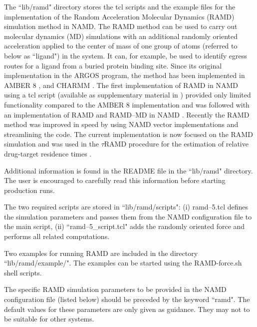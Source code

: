 The ``lib/ramd" directory stores the tcl scripts and the example files for the implementation of the Random Acceleration Molecular Dynamics (RAMD) simulation method in NAMD. 
The RAMD method can be used to carry out molecular dynamics (MD) simulations with an additional randomly oriented acceleration applied to the center of mass of one group of atoms (referred to below as ``ligand") in the system. 
It can, for example, be used to identify egress routes for a ligand from a buried protein binding site. 
Since its original implementation in the ARGOS  program, the method has been implemented in AMBER 8 , and CHARMM . 
The first implementation of RAMD in NAMD using a tcl script (available as supplementary material in ) provided only limited functionality compared to the AMBER 8 implementation and was followed with an implementation of RAMD and RAMD--MD in NAMD . Recently the RAMD method was improved in speed by using NAMD vector implementations and streamlining the code. The current implementation is now focused on the RAMD simulation and was used in the $\tau$RAMD procedure for the estimation of relative drug-target residence times .

Additional information is found in the README file in the ``lib/ramd" directory. 
The user is encouraged to carefully read this information before starting production runs.

The two required scripts are stored in ``lib/ramd/scripts": (i) ramd--5.tcl defines the simulation parameters and passes them from the NAMD configuration file to the main script, (ii) ``ramd--5\_script.tcl" adds the randomly oriented force and performs all related computations.

Two examples for running RAMD are included in the directory ``lib/ramd/example/". The examples can be started using the RAMD-force.sh shell scripts.

The specific RAMD simulation parameters to be provided in the NAMD configuration file (listed below) should be preceded by the keyword ``ramd". 
The default values for these parameters are only given as guidance. 
They may not to be suitable for other systems. 

